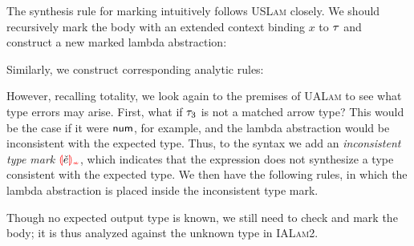 The synthesis rule for marking intuitively follows \textsc{USLam} closely. We should recursively
mark the body with an extended context binding $x$ to $\TMV$ and construct a new marked lambda
abstraction:
%
\begin{mathpar}

\end{mathpar}
%
Similarly, we construct corresponding analytic rules:
%
\begin{mathpar}

\end{mathpar}
%
However, recalling totality, we look again to the premises of \textsc{UALam} to see what type errors
may arise. First, what if $\TMV_3$ is not a matched arrow type? This would be the case if it were
$\TNum$, for example, and the lambda abstraction would be inconsistent with the expected type. Thus,
to the syntax we add an \emph{inconsistent type mark} $\ECInconType{\ECMV}$, which indicates that
the expression does not synthesize a type consistent with the expected type. We then have the
following rules, in which the lambda abstraction is placed inside the inconsistent type mark.
%
\begin{mathpar}

\end{mathpar}
%
Though no expected output type is known, we still need to check and mark the body; it is thus
analyzed against the unknown type in \textsc{IALam2}.

